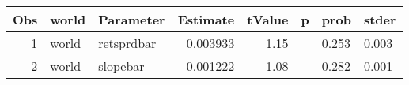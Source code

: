 

\begin{longtable}{|r|l|l|r|r|l|l|l|}\hline
   Obs &    world &    Parameter &    Estimate &    tValue &    p &    prob &    stder\\\hline
\endhead
   1 &    world &    retsprdbar &    0.003933 &    1.15 &      &    0.253 &    0.003\\\hline
   2 &    world &    slopebar &    0.001222 &    1.08 &      &    0.282 &    0.001\\\hline
\end{longtable}

